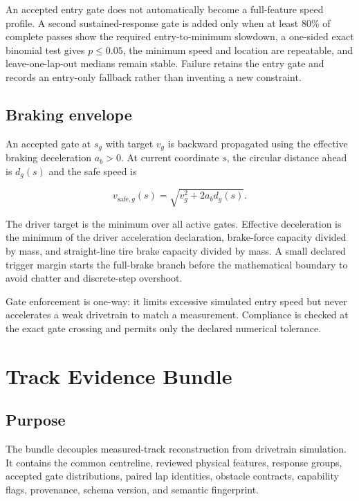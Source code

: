 \documentclass[11pt,oneside]{report}
\begin{document}
An accepted entry gate does not automatically become a full-feature speed profile. A
second sustained-response gate is added only when at least $80\%$ of complete passes
show the required entry-to-minimum slowdown, a one-sided exact binomial test gives
$p\leq0.05$, the minimum speed and location are repeatable, and leave-one-lap-out
medians remain stable. Failure retains the entry gate and records an entry-only
fallback rather than inventing a new constraint.

\section{Braking envelope}\label{sec:gate-envelope}

An accepted gate at $s_g$ with target $v_g$ is backward propagated using the effective
braking deceleration $a_b>0$.  At current coordinate $s$, the circular distance ahead is
$d_g(s)$ and the safe speed is

\begin{equation}
v_{\mathrm{safe},g}(s)=\sqrt{v_g^2+2a_b d_g(s)}.
\label{eq:brake-envelope}
\end{equation}

The driver target is the minimum over all active gates.  Effective deceleration is the
minimum of the driver acceleration declaration, brake-force capacity divided by mass,
and straight-line tire brake capacity divided by mass.  A small declared trigger margin
starts the full-brake branch before the mathematical boundary to avoid chatter and
discrete-step overshoot.

Gate enforcement is one-way: it limits excessive simulated entry speed but never
accelerates a weak drivetrain to match a measurement.  Compliance is checked at the
exact gate crossing and permits only the declared numerical tolerance.

\chapter{Track Evidence Bundle}\label{ch:bundle}

\section{Purpose}

The bundle decouples measured-track reconstruction from drivetrain simulation.  It
contains the common centreline, reviewed physical features, response groups, accepted
gate distributions, paired lap identities, obstacle contracts, capability flags,
provenance, schema version, and semantic fingerprint.
\end{document}
